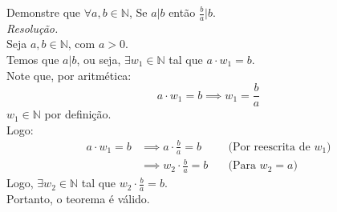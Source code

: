 Demonstre que $\forall a, b \in \mathbb{N}$, Se $a |b$ então $\frac{b}{a} | b$. \\
\emph{Resolução.} \\
Seja $a, b \in \mathbb{N}$, com $a > 0$. \\
Temos que $a | b$, ou seja, $\exists w_1 \in \mathbb{N}$ tal que $a \cdot w_1 = b$. \\
Note que, por aritmética:
\begin{displaymath}
    a \cdot w_1 = b \implies w_1 = \frac{b}{a}
\end{displaymath}
$w_1 \in \mathbb{N}$ por definição. \\
Logo:
\begin{align*}
    a \cdot w_1 = b           & \implies a \cdot \frac{b}{a} = b & \quad \text{(Por reescrita de $w_1$)} \\ & \implies
    w_2 \cdot \frac{b}{a} = b & \quad \text{(Para $w_2 = a$)}
\end{align*}
Logo, $\exists w_2 \in \mathbb{N}$ tal que $w_2 \cdot \frac{b}{a} = b$. \\
Portanto, o teorema é válido.
